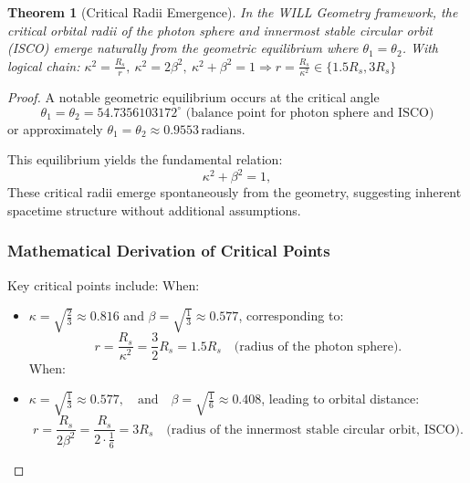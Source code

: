 \documentclass[12pt, a4paper]{article}
\newtheorem{theorem}{Theorem}[section]
\begin{document}
\begin{theorem}[Critical Radii Emergence]
In the WILL Geometry framework, the critical orbital radii of the photon sphere and innermost stable circular orbit (ISCO) emerge naturally from the geometric equilibrium where $\theta_1 = \theta_2$. With logical chain: $\kappa^2{=}\frac{R_s}{r},\ \kappa^2{=}2\beta^2,\ \kappa^2{+}\beta^2{=}1 \Rightarrow r=\frac{R_s}{\kappa^2}\in\{1.5R_s,3R_s\}$
\end{theorem}
\begin{proof}
A notable geometric equilibrium occurs at the critical angle 
\begin{equation}
    \theta_1 = \theta_2= 54.7356103172^{\circ} \text{ (balance point for photon sphere and ISCO)}
\end{equation}
or approximately $\theta_1 = \theta_2 \approx 0.9553\,\text{radians}$.


This equilibrium yields the fundamental relation:
\begin{equation}
\kappa^2 + \beta^2 = 1,
\end{equation}
These critical radii emerge spontaneously from the geometry, suggesting inherent spacetime structure without additional assumptions.

\subsubsection{Mathematical Derivation of Critical Points}

Key critical points include:
When:
\begin{itemize}
    \item \(\kappa = \sqrt{\frac{2}{3}} \approx 0.816\) and \(\beta = \sqrt{\frac{1}{3}} \approx 0.577\), corresponding to:
    \[
    r = \frac{R_s}{\kappa^2} =\frac{3}{2}R_s = 1.5R_s \quad \text{(radius of the photon sphere)}.
    \]
    When:
    \item      \( \kappa=\sqrt{\frac{1}{3}}\approx 0.577, \quad \text{and} \quad  \beta = \sqrt{\frac{1}{6}} \approx 0.408\), leading to orbital distance:
    \[
    r = \frac{R_s}{2\beta^2} = \frac{R_s}{2 \cdot \frac{1}{6}} = 3R_s \quad \text{(radius of the innermost stable circular orbit, ISCO)}.
    \]
\end{itemize}


\end{proof}
\end{document}

